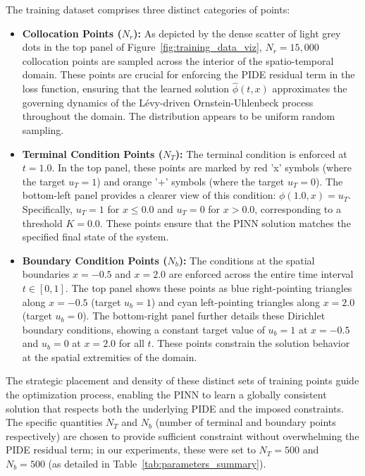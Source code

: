 \documentclass[11pt,twoside,openright]{report}
\begin{document}
The training dataset comprises three distinct categories of points:

\begin{itemize}
    \item \textbf{Collocation Points ($N_r$):} As depicted by the dense scatter of light grey dots in the top panel of Figure~\ref{fig:training_data_viz}, $N_r = 15,000$ collocation points are sampled across the interior of the spatio-temporal domain. These points are crucial for enforcing the PIDE residual term in the loss function, ensuring that the learned solution $\hat{\phi}(t,x)$ approximates the governing dynamics of the Lévy-driven Ornstein-Uhlenbeck process throughout the domain. The distribution appears to be uniform random sampling.

    \item \textbf{Terminal Condition Points ($N_T$):} The terminal condition is enforced at $t=1.0$. In the top panel, these points are marked by red 'x' symbols (where the target $u_T=1$) and orange '+' symbols (where the target $u_T=0$). The bottom-left panel provides a clearer view of this condition: $\phi(1.0, x) = u_T$. Specifically, $u_T = 1$ for $x \le 0.0$ and $u_T = 0$ for $x > 0.0$, corresponding to a threshold $K=0.0$. These points ensure that the PINN solution matches the specified final state of the system.

    \item \textbf{Boundary Condition Points ($N_b$):} The conditions at the spatial boundaries $x=-0.5$ and $x=2.0$ are enforced across the entire time interval $t \in [0,1]$. The top panel shows these points as blue right-pointing triangles along $x=-0.5$ (target $u_b=1$) and cyan left-pointing triangles along $x=2.0$ (target $u_b=0$). The bottom-right panel further details these Dirichlet boundary conditions, showing a constant target value of $u_b=1$ at $x=-0.5$ and $u_b=0$ at $x=2.0$ for all $t$. These points constrain the solution behavior at the spatial extremities of the domain.
\end{itemize}

The strategic placement and density of these distinct sets of training points guide the optimization process, enabling the PINN to learn a globally consistent solution that respects both the underlying PIDE and the imposed constraints. The specific quantities $N_T$ and $N_b$ (number of terminal and boundary points respectively) are chosen to provide sufficient constraint without overwhelming the PIDE residual term; in our experiments, these were set to $N_T=500$ and $N_b=500$ (as detailed in Table~\ref{tab:parameters_summary}).
\end{document}
